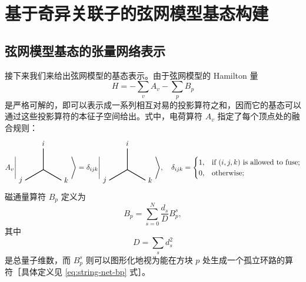 \chapter{基于奇异关联子的弦网模型基态构建}

\tikzset{x=1em, y=1em, node font=\footnotesize}
\newcommand{\Vertex}[3]{
  \begin{tikzpicture}[baseline=0, thick]
    \draw (0,0) -- (90:1)  node [above] {$#1$}
          (0,0) -- (210:1) node [left]  {$#2$}
          (0,0) -- (330:1) node [right] {$#3$};
  \end{tikzpicture}
}

\section{弦网模型基态的张量网络表示}

接下来我们来给出弦网模型的基态表示\cite{gu2009tensor2,buerschaper2009explicit}。由于弦网模型的 Hamilton 量
\begin{equation}
  H = -\sum_v A_v - \sum_p B_p
\end{equation}
是严格可解的，即可以表示成一系列相互对易的投影算符之和，因而它的基态可以通过这些投影算符的本征子空间给出。式中，电荷算符 $A_v$ 指定了每个顶点处的融合规则：
\begin{equation}
  A_v \Biggl| \Vertex ijk \Biggr\rangle = \delta_{ijk} \Biggl| \Vertex ijk \Biggr\rangle, \quad
  \delta_{ijk} = \begin{cases}
    1, & \text{if $(i,j,k)$ is allowed to fuse;} \\
    0, & \text{otherwise;}
  \end{cases}
\end{equation}
磁通量算符 $B_p$ 定义为
\begin{equation}
  B_p = \sum_{s=0}^N \frac{d_s}{D} B_p^s,
\end{equation}
其中
\begin{equation}
  D = \sum_s d_s^2
\end{equation}
是总量子维数，而 $B_p^s$ 则可以图形化地视为能在方块 $p$ 处生成一个孤立环路的算符［具体定义见 \eqref{eq:string-net-bp} 式］。

